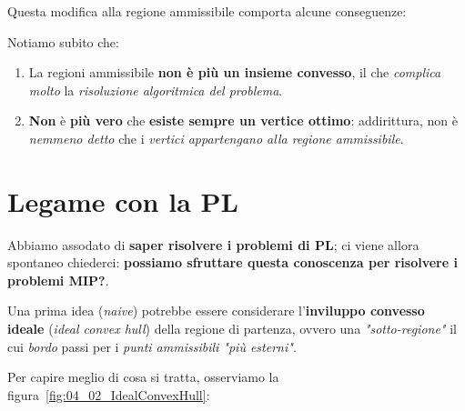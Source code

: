 Questa modifica alla regione ammissibile comporta alcune conseguenze:

\begin{remark}
    Notiamo subito che:
    \begin{enumerate}
        \item La regioni ammissibile \textbf{non è più un insieme convesso}, il che
            \textit{complica molto} la \textit{risoluzione algoritmica del problema}.
        \item \textbf{Non} è \textbf{più vero} che \textbf{esiste sempre un vertice ottimo}:
            addirittura, non è \textit{nemmeno detto} che i \textit{vertici appartengano
            alla regione ammissibile}.
    \end{enumerate}
\end{remark}

\section{Legame con la PL}

Abbiamo assodato di \textbf{saper risolvere i problemi di PL}; ci viene allora spontaneo
chiederci: \textbf{possiamo sfruttare questa conoscenza per risolvere i problemi MIP?}.

Una prima idea (\textit{naive}) potrebbe essere considerare 
l'\textbf{inviluppo convesso ideale} (\textit{ideal convex hull}) della regione
di partenza, ovvero una \textit{"sotto-regione"} il cui \textit{bordo} 
passi per i \textit{punti ammissibili "più esterni"}.

Per capire meglio di cosa si tratta, osserviamo la figura~\ref{fig:04_02_IdealConvexHull}:

